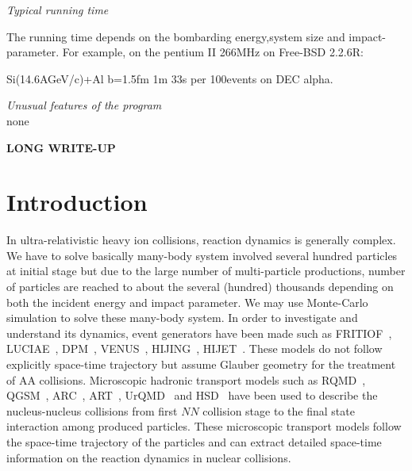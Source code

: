 \documentclass[]{article}
\begin{document}
\bigskip

{\noindent\em Typical running time}

\noindent
 The running time depends on the bombarding energy,system size and
 impact-parameter.
For example, on the pentium II 266MHz on Free-BSD 2.2.6R:

Si(14.6AGeV/c)+Al b=1.5fm 1m 33s per 100events on DEC alpha.


{\noindent\em Unusual features of the program}\\
\noindent none


\bigskip
\begin{flushleft}
{\large \bf LONG WRITE-UP}\\
\end{flushleft}


\section{Introduction}

In ultra-relativistic heavy ion collisions,
 reaction dynamics is generally complex.
We have to solve basically many-body system involved several
  hundred particles at initial stage
  but due to the large number of multi-particle productions,
  number of particles are reached to about the several (hundred) thousands
 depending on both the incident energy and impact parameter.
We may use Monte-Carlo simulation to solve these many-body system.
In order to investigate and understand its dynamics,
  event generators have been made such as
 FRITIOF~\cite{fritiof}, LUCIAE~\cite{luciae},
 DPM~\cite{dpm}, VENUS~\cite{venus},
 HIJING~\cite{hijing}, HIJET~\cite{hijet}.
These models do not follow explicitly space-time trajectory but
assume Glauber geometry for the treatment of AA collisions.
Microscopic hadronic transport models such as
  RQMD~\cite{rqmd1,rqmd2}, QGSM~\cite{qgsm}, ARC~\cite{arc},
  ART~\cite{art}, UrQMD~\cite{urqmd} and HSD~\cite{hsd}
  have been used to describe the nucleus-nucleus collisions
  from first $NN$ collision stage
  to the final state interaction among produced particles.
These microscopic transport models follow the space-time trajectory
  of the particles and can extract detailed space-time information
  on the reaction dynamics in nuclear collisions.
\end{document}

